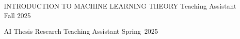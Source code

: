 


\begin{cvhonors}

  \cvhonor
    {INTRODUCTION TO MACHINE LEARNING THEORY} %
    {Teaching Assistant} %
    {} %
    {Fall 2025} %

  \cvhonor
    {AI Thesis Research} %
    {Teaching Assistant} %
    {} %
    {Spring~2025} %
\end{cvhonors}
